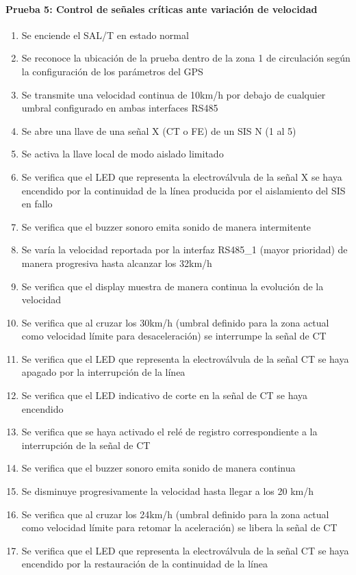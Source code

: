 \paragraph{Prueba 5: Control de señales críticas ante variación de velocidad}
\begin{enumerate}
\item	Se enciende el SAL/T en estado normal
\item	Se reconoce la ubicación de la prueba dentro de la zona 1 de circulación según la configuración de los parámetros del GPS
\item	Se transmite una velocidad continua de 10km/h por debajo de cualquier umbral configurado en ambas interfaces RS485
\item	Se abre una llave de una señal X (CT o FE) de un SIS N (1 al 5)
\item	Se activa la llave local de modo aislado limitado
\item	Se verifica que el LED que representa la electroválvula de la señal X se haya encendido por la continuidad de la línea producida por el aislamiento del SIS en fallo
\item	Se verifica que el buzzer sonoro emita sonido de manera intermitente
\item	Se varía la velocidad reportada por la interfaz RS485\_1 (mayor prioridad) de manera progresiva hasta alcanzar los 32km/h
\item	Se verifica que el display muestra de manera continua la evolución de la velocidad
\item	Se verifica que al cruzar los 30km/h (umbral definido para la zona actual como velocidad límite para desaceleración) se interrumpe la señal de CT
\item	Se verifica que el LED que representa la electroválvula de la señal CT se haya apagado por la interrupción de la línea
\item	Se verifica que el LED indicativo de corte en la señal de CT se haya encendido
\item	Se verifica que se haya activado el relé de registro correspondiente a la interrupción de la señal de CT
\item 	Se verifica que el buzzer sonoro emita sonido de manera continua
\item	Se disminuye progresivamente la velocidad hasta llegar a los 20 km/h
\item	Se verifica que al cruzar los 24km/h (umbral definido para la zona actual como velocidad límite para retomar la aceleración) se libera la señal de CT
\item	Se verifica que el LED que representa la electroválvula de la señal CT se haya encendido por la restauración de la continuidad de la línea

\end{enumerate}
